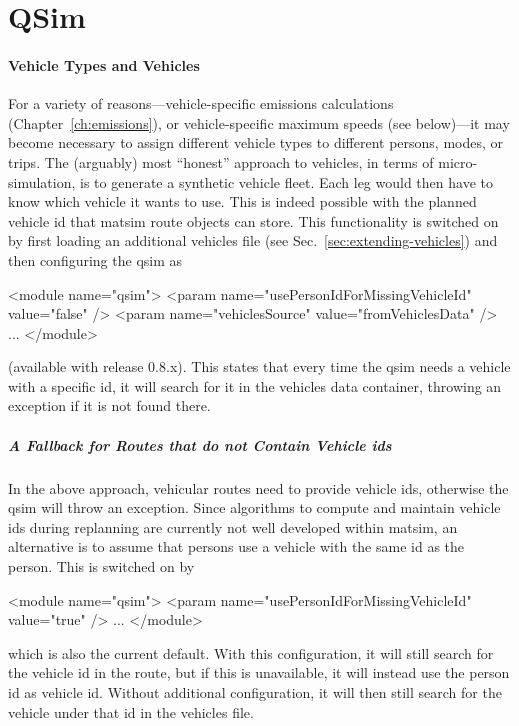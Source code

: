 \chapter{QSim}
\label{sec:extending-qsim}

\subsubsection{Vehicle Types and Vehicles}
\label{sec:vehicles-in-qsim}

For a variety of reasons---\eg vehicle-specific emissions calculations (Chapter~\ref{ch:emissions}), or vehicle-specific maximum speeds (see below)---it may become necessary to assign different vehicle types to different persons, modes, or trips.
%
The (arguably) most ``honest'' approach to vehicles, in terms of micro-simulation, is to generate a synthetic vehicle fleet.  Each leg would then have to know which vehicle it wants to use.  This is indeed possible with the planned vehicle \gls{id} that \Gls{matsim} route objects can store.  This functionality is switched on by first loading an additional vehicles file (see Sec.~\ref{sec:extending-vehicles}) and then configuring the \gls{qsim} as
\begin{xml}
<module name="qsim">
   <param name="usePersonIdForMissingVehicleId" value="false" />
   <param name="vehiclesSource" value="fromVehiclesData" />
   ...
</module>
\end{xml}
(available with release 0.8.x).  This states that every time the \gls{qsim} needs a vehicle with a specific \gls{id}, it will search for it in the vehicles data container, throwing an exception if it is not found there.  

\paragraph{A Fallback for Routes that do not Contain Vehicle \glspl{id}}

In the above approach, vehicular routes need to provide vehicle \glspl{id}, otherwise the \gls{qsim} will throw an exception.  Since algorithms to compute and maintain vehicle \glspl{id} during replanning are currently not well developed within \gls{matsim}, an alternative is to assume that persons use a vehicle with the same \gls{id} as the person.  This is switched on by
\begin{xml}
<module name="qsim">
   <param name="usePersonIdForMissingVehicleId" value="true" />
   ...
</module>
\end{xml}
which is also the current default.
%
With this configuration, it will still search for the vehicle \gls{id} in the route, but if this is unavailable, it will instead use the person \gls{id} as vehicle \gls{id}.  Without additional configuration, it will then still search for the vehicle under that \gls{id} in the vehicles file.

